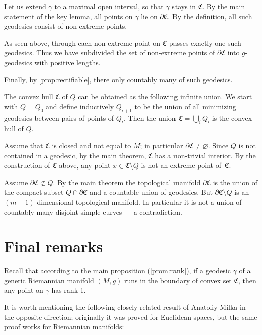\documentclass[a4paper,10pt]{article}
\begin{document}
Let us extend $\gamma$ to a maximal open interval, so that $\gamma$ stays in $\mathfrak C$.
By the main statement of the key lemma, all points on $\gamma$ lie on $\partial \mathfrak C$.
By the definition, all such geodesics consist of non-extreme points.

As seen above, through each non-extreme point on $\mathfrak C$ passes exactly one such geodesics.
Thus we have subdivided the set of non-extreme points of $\partial\mathfrak C$ into $g$-geodesics with positive lengths.

Finally, by \ref{prop:rectifiable}, there only countably many of such geodesics.
\qeds

The convex hull $\mathfrak{C}$ of $Q$ can be obtained as the following infinite union.
We start with $Q=Q_0$ and define inductively $Q_{i+1}$ to be the union of all minimizing geodesics between pairs of points of $Q_i$.
Then the union $\mathfrak{C}= \bigcup_{i} 
Q_i$ is the convex hull of $Q$.

Assume that $\mathfrak{C}$ is closed and not equal to $M$; in particular $\partial\mathfrak{C}\ne \varnothing$.
Since $Q$ is not contained in a geodesic, by the main theorem, $\mathfrak{C}$ has a non-trivial interior.
By the construction of $\mathfrak{C}$ above, any point $x\in \mathfrak{C} \setminus Q$ is not an extreme point of~$\mathfrak{C}$.

Assume $\partial \mathfrak{C} \not\subset Q$.
By the main theorem the topological manifold $\partial \mathfrak{C}$ is the union of the compact subset $Q\cap \partial \mathfrak{C}$ and a countable union of geodesics.
But $\partial \mathfrak{C} \setminus Q$ is an $(m-1)$-dimensional topological manifold.
In particular it is not a union of countably many disjoint simple curves --- a contradiction.
\qeds

\section{Final remarks}

Recall that according to the main proposition (\ref{prom:rank}), if a geodesic $\gamma$ of a generic Riemannian manifold $(M,g)$ runs in the boundary of convex set $\mathfrak{C}$, then any point on $\gamma$ has rank 1.

It is worth mentioning the following closely  related result of Anatoliy Milka \cite[§~4]{milka} in the opposite direction; originally it was proved for Euclidean spaces, but the same proof works for Riemannian manifolds:
\end{document}
